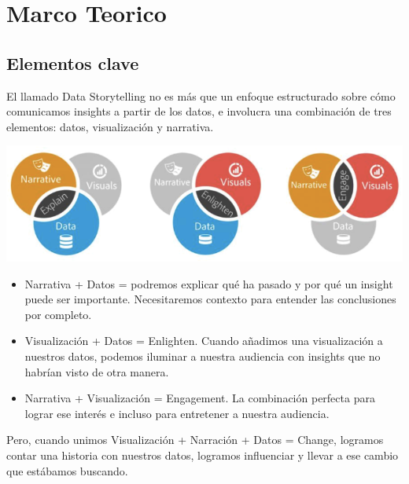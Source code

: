 \documentclass[preprint,12pt]{elsarticle}
\begin{document}
	
	

\section{Marco Teorico}
	
\subsection{Elementos clave}	
	El llamado Data Storytelling no es más que un enfoque estructurado sobre cómo comunicamos insights a partir de los datos, e involucra una combinación de 	tres elementos: datos, visualización y narrativa.
	\begin{center}
	\includegraphics[width=15cm]{./Imagenes/imagen1} 
	\end{center}
\begin{itemize}
\item	Narrativa + Datos = podremos explicar qué ha pasado y por qué un insight puede ser importante. Necesitaremos contexto para entender las conclusiones por completo.
\item Visualización + Datos = Enlighten. Cuando añadimos una visualización a nuestros datos, podemos iluminar a nuestra audiencia con insights que no habrían visto de otra manera.
\item	Narrativa + Visualización = Engagement. La combinación perfecta para lograr ese interés e incluso para entretener a nuestra audiencia. 
\end{itemize} 

	Pero, cuando unimos Visualización + Narración + Datos = Change, logramos contar una historia con nuestros datos, logramos influenciar y llevar a ese 			cambio que estábamos buscando.
\end{document}
